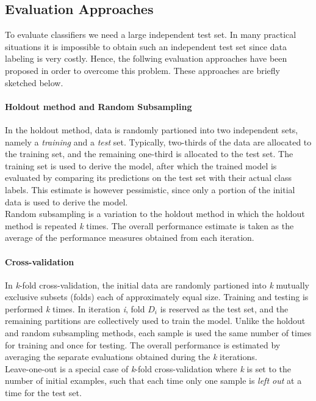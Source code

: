\subsection{Evaluation Approaches}
To evaluate classifiers we need a large independent test set. In many practical situations it is  impossible to obtain such an independent test set   since data labeling is very costly. Hence, the follwing evaluation approaches  have been proposed in order to overcome this problem. These approaches are briefly sketched below.

\paragraph{Holdout method and Random Subsampling}
In the holdout method, data is randomly partioned into two independent sets, namely a \textit{training} and a \textit{test} set. Typically, two-thirds of the data are allocated to the training set, and the remaining one-third is allocated to the test set. The training set is used to derive the model, after which the trained model is evaluated by comparing its predictions on the test set with their actual class labels. This estimate is however pessimistic, since only a portion of the initial data is used to derive the model.\\Random subsampling is a variation to the holdout method in which the holdout method is repeated \textit{k} times. The overall performance estimate is taken as the average of the performance measures obtained from each iteration.~\cite{Jiawei06}

\paragraph{Cross-validation}
In \textit{k}-fold cross-validation, the initial data are randomly partioned into \textit{k} mutually exclusive subsets (folds) each of approximately equal size. Training and testing is performed \textit{k} times. In iteration \textit{i}, fold \(D_i\) is reserved as the test set, and the remaining partitions are collectively used to train the model. Unlike the holdout and random subsampling methods, each sample is used the same number of times for training and once for testing. The overall performance is estimated by averaging the separate evaluations obtained during the \textit{k} iterations.\\Leave-one-out is a special case of \textit{k}-fold cross-validation where \textit{k} is set to the number of initial examples, such that each time only one sample is \textit{left out} at a time for the test set.

